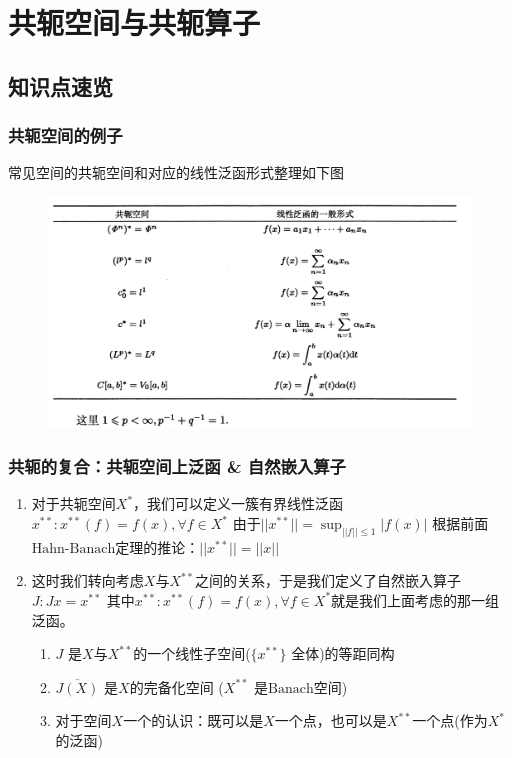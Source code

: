 \documentclass[a4paper, 12pt]{ctexart}
\begin{document}
\section{共轭空间与共轭算子}
\subsection{知识点速览}

\subsubsection{共轭空间的例子}
常见空间的共轭空间和对应的线性泛函形式整理如下图
\begin{figure}[h]
    \centering
    \includegraphics[width=0.8\linewidth]{11.png}
    \nonumber
    \label{fig:enter-label}
\end{figure}

\subsubsection{共轭的复合：共轭空间上泛函 \& 自然嵌入算子}
\begin{enumerate}
    \item 对于共轭空间$X^*$，我们可以定义一簇有界线性泛函$x^{**}:x^{**}(f)=f(x),\forall f \in X^*$ 由于$\lvert \lvert x^{**} \rvert \rvert=\sup_{\lvert \lvert f \rvert \rvert \leq 1}\lvert f(x) \rvert$ 根据前面$\text{Hahn-Banach}$定理的推论：$\lvert \lvert x^{**} \rvert \rvert=\lvert \lvert x \rvert \rvert$
    \item 这时我们转向考虑$X$与$X^{**}$之间的关系，于是我们定义了自然嵌入算子$J:Jx=x^{**}$ 其中$x^{**}:x^{**}(f)=f(x),\forall f \in X^*$就是我们上面考虑的那一组泛函。
    \begin{enumerate}
        \item $J$ 是$X$与$X^{**}$的一个线性子空间($\{ x^{**} \}$ 全体)的等距同构
        \item $\overline{J(X)}$ 是$X$的完备化空间 ($X^{**}$ 是$\text{Banach}$空间)
        \item 对于空间$X$一个的认识：既可以是$X$一个点，也可以是$X^{**}$一个点(作为$X^*$的泛函)
    \end{enumerate}
\end{enumerate}
\end{document}
